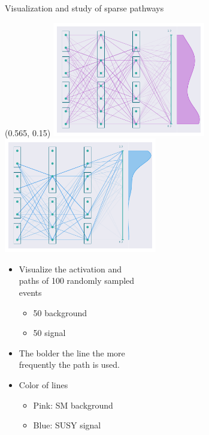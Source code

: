 \documentclass[UKenglish]{beamer}
\begin{document}
\begin{frame}{Visualization and study of sparse pathways}
    \begin{textblock}{0.8}(0.565, 0.15)
        \includegraphics[width = 0.5\textwidth]{figures/NetworkVis/AfterTrainingBkg.pdf}
        \includegraphics[width = 0.5\textwidth]{figures/NetworkVis/AfterTrainingSig.pdf}
    \end{textblock}
    \begin{itemize}
        \item Visualize the activation and \\
        paths of 100 randomly sampled \\
        events
        \begin{itemize}
            \item 50 background
            \item 50 signal
        \end{itemize}
        \item The bolder the line the more\\ 
        frequently the path is used.
        \item Color of lines 
        \begin{itemize}
            \item Pink: SM background
            \item Blue: SUSY signal
        \end{itemize}
    \end{itemize}
\end{frame}
\end{document}

